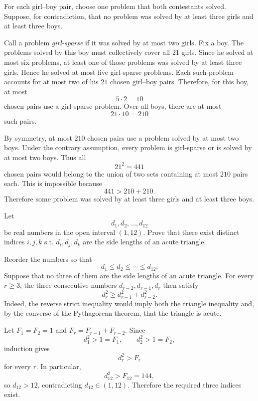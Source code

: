     \begin{solution}
        For each girl--boy pair, choose one problem that both contestants
        solved. Suppose, for contradiction, that no problem was solved by at
        least three girls and at least three boys.

        Call a problem \emph{girl-sparse} if it was solved by at most two
        girls. Fix a boy. The problems solved by this boy must collectively
        cover all $21$ girls. Since he solved at most six problems, at least one
        of those problems was solved by at least three girls. Hence he solved at
        most five girl-sparse problems. Each such problem accounts for at most
        two of his $21$ chosen girl--boy pairs. Therefore, for this boy, at most
        \[
            5\cdot2=10
        \]
        chosen pairs use a girl-sparse problem. Over all boys, there are at
        most
        \[
            21\cdot10=210
        \]
        such pairs.

        By symmetry, at most $210$ chosen pairs use a problem solved by at most
        two boys. Under the contrary assumption, every problem is girl-sparse
        or is solved by at most two boys. Thus all
        \[
            21^2=441
        \]
        chosen pairs would belong to the union of two sets containing at most
        $210$ pairs each. This is impossible because
        \[
            441>210+210.
        \]
        Therefore some problem was solved by at least three girls and at least
        three boys.
    \end{solution}

    \begin{expectedproblem}[2012 Putnam]
        Let
        \[
            d_1,d_2,\ldots,d_{12}
        \]
        be real numbers in the open interval $(1,12)$. Prove that there exist
        distinct indices $i,j,k$ s.t. $d_i,d_j,d_k$ are the side lengths
        of an acute triangle.
    \end{expectedproblem}

    \begin{solution}
        Reorder the numbers so that
        \[
            d_1\leq d_2\leq\cdots\leq d_{12}.
        \]
        Suppose that no three of them are the side lengths of an acute
        triangle. For every $r\geq3$, the three consecutive numbers
        $d_{r-2},d_{r-1},d_r$ then satisfy
        \[
            d_r^2\geq d_{r-1}^2+d_{r-2}^2.
        \]
        Indeed, the reverse strict inequality would imply both the triangle
        inequality and, by the converse of the Pythagorean theorem, that the
        triangle is acute.

        Let $F_1=F_2=1$ and $F_r=F_{r-1}+F_{r-2}$. Since
        \[
            d_1^2>1=F_1,
            \qquad
            d_2^2>1=F_2,
        \]
        induction gives
        \[
            d_r^2>F_r
        \]
        for every $r$. In particular,
        \[
            d_{12}^2>F_{12}=144,
        \]
        so $d_{12}>12$, contradicting $d_{12}\in(1,12)$. Therefore the
        required three indices exist.
    \end{solution}

